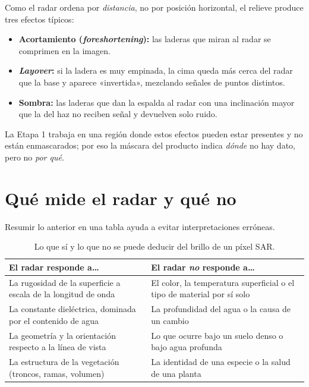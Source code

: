 \documentclass[11pt,a4paper]{article}
\begin{document}
Como el radar ordena por \emph{distancia}, no por posición horizontal, el relieve produce tres efectos
típicos:
\begin{itemize}
  \item \textbf{Acortamiento (\emph{foreshortening}):} las laderas que miran al radar se comprimen en la
        imagen.
  \item \textbf{\emph{Layover}:} si la ladera es muy empinada, la cima queda más cerca del radar que la base y
        aparece «invertida», mezclando señales de puntos distintos.
  \item \textbf{Sombra:} las laderas que dan la espalda al radar con una inclinación mayor que la del haz no
        reciben señal y devuelven solo ruido.
\end{itemize}
La Etapa 1 trabaja en una región donde estos efectos pueden estar presentes y no están enmascarados; por eso
la máscara del producto indica \emph{dónde} no hay dato, pero no \emph{por qué}.

\section{Qué mide el radar y qué no}
\label{sec:mide-no-mide}

Resumir lo anterior en una tabla ayuda a evitar interpretaciones erróneas.

\begin{table}[htbp]
\centering\small
\begin{tabularx}{\linewidth}{p{.3\linewidth}X}
\toprule
\textbf{El radar responde a\ldots} & \textbf{El radar \emph{no} responde a\ldots}\\\midrule
La rugosidad de la superficie a escala de la longitud de onda & El color, la temperatura superficial o el tipo de material por sí solo\\
La constante dieléctrica, dominada por el contenido de agua & La profundidad del agua o la causa de un cambio\\
La geometría y la orientación respecto a la línea de vista & Lo que ocurre bajo un suelo denso o bajo agua profunda\\
La estructura de la vegetación (troncos, ramas, volumen) & La identidad de una especie o la salud de una planta\\\bottomrule
\end{tabularx}
\caption{Lo que sí y lo que no se puede deducir del brillo de un píxel SAR.}
\label{tab:mide-no-mide}
\end{table}
\end{document}
